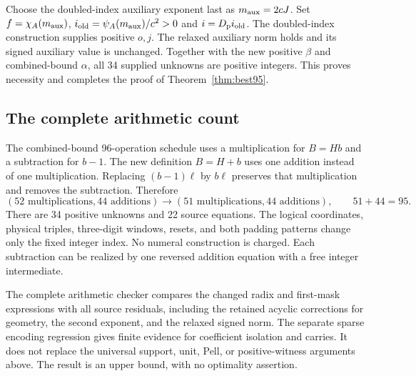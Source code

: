 Choose the doubled-index auxiliary exponent last as
$m_{\rm aux}=2cJ$. Set $f=\chi_A(m_{\rm aux})$,
$i_{\rm old}=\psi_A(m_{\rm aux})/c^2>0$ and
$i=D_{\rm p}i_{\rm old}$. The doubled-index construction
supplies positive $o,j$. The relaxed auxiliary norm holds
and its signed auxiliary value is unchanged. Together with
the new positive $\beta$ and combined-bound $\alpha$, all
34 supplied unknowns are positive integers. This proves
necessity and completes the proof of Theorem~\ref{thm:best95}.

\subsection{The complete arithmetic count}

The combined-bound 96-operation schedule uses a multiplication
for $B=Hb$ and a subtraction for $b-1$. The new definition
$B=H+b$ uses one addition instead of one multiplication.
Replacing $(b-1)\ell$ by $b\ell$ preserves that multiplication
and removes the subtraction. Therefore
\[
 (52\text{ multiplications},44\text{ additions})
 \longrightarrow
 (51\text{ multiplications},44\text{ additions}),
 \qquad 51+44=95.
\]
There are 34 positive unknowns and 22 source equations. The
logical coordinates, physical triples, three-digit windows,
resets, and both padding patterns change only the fixed integer
index. No numeral construction is charged. Each subtraction
can be realized by one reversed addition equation with a free
integer intermediate.

The complete arithmetic checker compares the changed radix
and first-mask expressions with all source residuals, including
the retained acyclic corrections for geometry, the second
exponent, and the relaxed signed norm. The separate sparse
encoding regression gives finite evidence for coefficient
isolation and carries. It does not replace the universal
support, unit, Pell, or positive-witness arguments above.
The result is an upper bound, with no optimality assertion.
